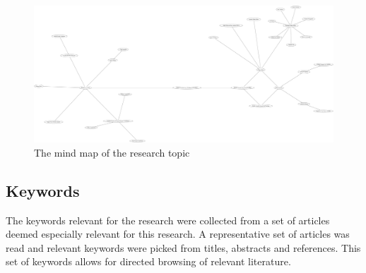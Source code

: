 \documentclass[a4paper,10pt]{article}
\begin{document}
\begin{figure}[ht]
\begin{center}
 \includegraphics[width=\textwidth]{./field.png}
\end{center}
\caption{The mind map of the research topic}
\end{figure} 

\subsection{Keywords}

The keywords relevant for the research were collected from a set of articles deemed especially relevant for this research. A representative set of articles was
read and relevant keywords were picked from titles, abstracts and references. This set of keywords allows for directed browsing of relevant literature.
\end{document}
